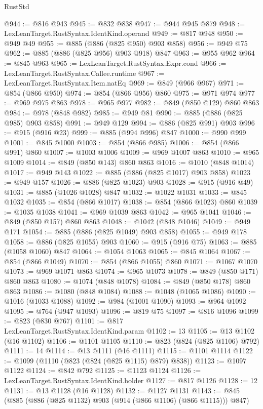 \begin{lexlean}{RustStd}
\begin{coremodule}
@944 := @816 @943
@945 := @832 @838
@947 := @944 @945 @879
@948 := LexLeanTarget.RustSyntax.IdentKind.operand
@949 := @817 @948
@950 := @949 @49
@955 := @885 (@886 (@825 @950) @903 @858)
@956 := @949 @75
@962 := @885 (@886 (@825 @956) @903 @918) @847
@963 := @955 @962
@964 := @845 @963
@965 := LexLeanTarget.RustSyntax.Expr.cond
@966 := LexLeanTarget.RustSyntax.Callee.runtime
@967 := LexLeanTarget.RustSyntax.Item.natEq
@969 := @849 (@966 @967)
@971 := @854 (@866 @950)
@974 := @854 (@866 @956) @860
@975 := @971 @974
@977 := @969 @975 @863
@978 := @965 @977
@982 := @849 (@850 @129) @860 @863
@984 := @978 (@848 @982)
@985 := @949 @81
@990 := @885 (@886 (@825 @985) @903 @858)
@991 := @949 @129
@994 := @886 (@825 @991) @903
@996 := @915 (@916 @23)
@999 := @885 (@994 @996) @847
@1000 := @990 @999
@1001 := @845 @1000
@1003 := @854 (@866 @985)
@1006 := @854 (@866 @991) @860
@1007 := @1003 @1006
@1009 := @969 @1007 @863
@1010 := @965 @1009
@1014 := @849 (@850 @143) @860 @863
@1016 := @1010 (@848 @1014)
@1017 := @949 @143
@1022 := @885 (@886 (@825 @1017) @903 @858)
@1023 := @949 @157
@1026 := @886 (@825 @1023) @903
@1028 := @915 (@916 @49)
@1031 := @885 (@1026 @1028) @847
@1032 := @1022 @1031
@1033 := @845 @1032
@1035 := @854 (@866 @1017)
@1038 := @854 (@866 @1023) @860
@1039 := @1035 @1038
@1041 := @969 @1039 @863
@1042 := @965 @1041
@1046 := @849 (@850 @157) @860 @863
@1048 := @1042 (@848 @1046)
@1049 := @949 @171
@1054 := @885 (@886 (@825 @1049) @903 @858)
@1055 := @949 @178
@1058 := @886 (@825 @1055) @903
@1060 := @915 (@916 @75)
@1063 := @885 (@1058 @1060) @847
@1064 := @1054 @1063
@1065 := @845 @1064
@1067 := @854 (@866 @1049)
@1070 := @854 (@866 @1055) @860
@1071 := @1067 @1070
@1073 := @969 @1071 @863
@1074 := @965 @1073
@1078 := @849 (@850 @171) @860 @863
@1080 := @1074 (@848 @1078)
@1084 := @849 (@850 @178) @860 @863
@1086 := @1080 (@848 @1084)
@1088 := @1048 (@1065 @1086)
@1090 := @1016 (@1033 @1088)
@1092 := @984 (@1001 @1090)
@1093 := @964 @1092
@1095 := @764 (@947 @1093)
@1096 := @819 @75
@1097 := @816 @1096
@1099 := @823 (@830 @767)
@1101 := @817 LexLeanTarget.RustSyntax.IdentKind.param
@1102 := 13
@1105 := @13 @1102 (@16 @1102)
@1106 := @1101 @1105
@1110 := @823 (@824 (@825 @1106) @792)
@1111 := 14
@1114 := @13 @1111 (@16 @1111)
@1115 := @1101 @1114
@1122 := @1099 (@1110 (@823 (@824 (@825 @1115) @879) @838))
@1123 := @1097 @1122
@1124 := @842 @792
@1125 := @1123 @1124
@1126 := LexLeanTarget.RustSyntax.IdentKind.holder
@1127 := @817 @1126
@1128 := 12
@1131 := @13 @1128 (@16 @1128)
@1132 := @1127 @1131
@1143 := @845 (@885 (@886 (@825 @1132) @903 (@914 (@866 @1106) (@866 @1115))) @847)

\end{coremodule}
\end{lexlean}
